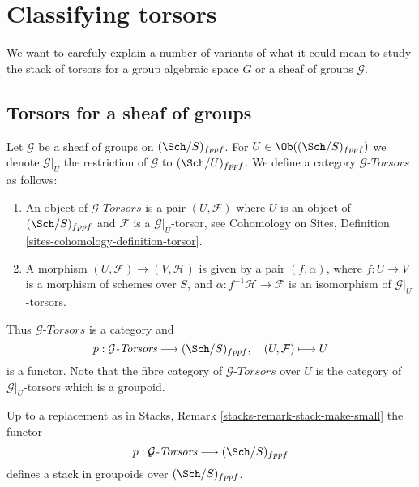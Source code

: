 \section{Classifying torsors}
\label{section-torsors}

\noindent
We want to carefuly explain a number of variants of what it could
mean to study the stack of torsors for a group algebraic space $G$
or a sheaf of groups $\mathcal{G}$.



\subsection{Torsors for a sheaf of groups}
\label{subsection-torsors-sheaf}

\noindent
Let $\mathcal{G}$ be a sheaf of groups on $(\Sch/S)_{fppf}$.
For $U \in \Ob((\Sch/S)_{fppf})$ we denote
$\mathcal{G}|_U$ the restriction of $\mathcal{G}$ to $(\Sch/U)_{fppf}$.
We define a category $\mathcal{G}\textit{-Torsors}$ as follows:
\begin{enumerate}
\item An object of $\mathcal{G}\textit{-Torsors}$ is a pair
$(U, \mathcal{F})$ where $U$ is an object of $(\Sch/S)_{fppf}$
and $\mathcal{F}$ is a $\mathcal{G}|_U$-torsor, see
Cohomology on Sites, Definition \ref{sites-cohomology-definition-torsor}.
\item A morphism $(U, \mathcal{F}) \to (V, \mathcal{H})$ is given
by a pair $(f, \alpha)$, where $f : U \to V$ is a morphism of schemes
over $S$, and $\alpha : f^{-1}\mathcal{H} \to \mathcal{F}$ is an
isomorphism of $\mathcal{G}|_U$-torsors.
\end{enumerate}
Thus $\mathcal{G}\textit{-Torsors}$ is a category and
$$
p : \mathcal{G}\textit{-Torsors} \longrightarrow (\Sch/S)_{fppf},
\quad
(U, \mathcal{F}) \longmapsto U
$$
is a functor. Note that the fibre category of $\mathcal{G}\textit{-Torsors}$
over $U$ is the category of $\mathcal{G}|_U$-torsors which is a groupoid.

\begin{lemma}
\label{lemma-torsors-sheaf-stack-in-groupoids}
Up to a replacement as in
Stacks, Remark \ref{stacks-remark-stack-make-small}
the functor
$$
p : \mathcal{G}\textit{-Torsors} \longrightarrow (\Sch/S)_{fppf}
$$
defines a stack in groupoids over $(\Sch/S)_{fppf}$.
\end{lemma}

